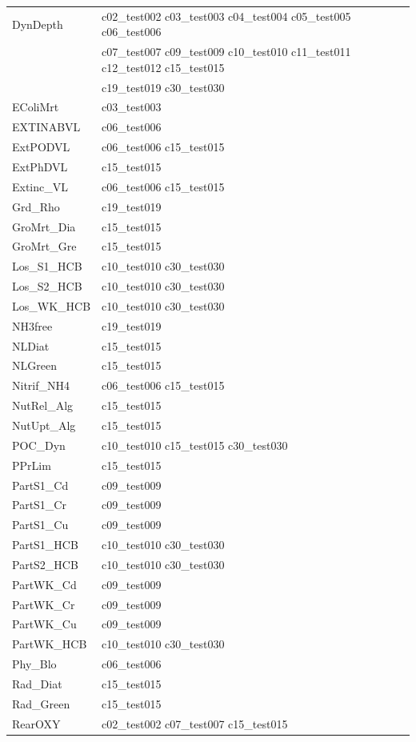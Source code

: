 \begin{longtable}{ll}
DynDepth & c02\_test002 c03\_test003 c04\_test004 c05\_test005 c06\_test006 \\ 
 & c07\_test007 c09\_test009 c10\_test010 c11\_test011 c12\_test012 c15\_test015 \\ 
 & c19\_test019 c30\_test030 \\
EColiMrt & c03\_test003 \\
EXTINABVL & c06\_test006 \\
ExtPODVL & c06\_test006 c15\_test015 \\
ExtPhDVL & c15\_test015 \\
Extinc\_VL & c06\_test006 c15\_test015 \\
Grd\_Rho & c19\_test019 \\
GroMrt\_Dia & c15\_test015 \\
GroMrt\_Gre & c15\_test015 \\
Los\_S1\_HCB & c10\_test010 c30\_test030 \\
Los\_S2\_HCB & c10\_test010 c30\_test030 \\
Los\_WK\_HCB & c10\_test010 c30\_test030 \\
NH3free & c19\_test019 \\
NLDiat & c15\_test015 \\
NLGreen & c15\_test015 \\
Nitrif\_NH4 & c06\_test006 c15\_test015 \\
NutRel\_Alg & c15\_test015 \\
NutUpt\_Alg & c15\_test015 \\
POC\_Dyn & c10\_test010 c15\_test015 c30\_test030 \\
PPrLim & c15\_test015 \\
PartS1\_Cd & c09\_test009 \\
PartS1\_Cr & c09\_test009 \\
PartS1\_Cu & c09\_test009 \\
PartS1\_HCB & c10\_test010 c30\_test030 \\
PartS2\_HCB & c10\_test010 c30\_test030 \\
PartWK\_Cd & c09\_test009 \\
PartWK\_Cr & c09\_test009 \\
PartWK\_Cu & c09\_test009 \\
PartWK\_HCB & c10\_test010 c30\_test030 \\
Phy\_Blo & c06\_test006 \\
Rad\_Diat & c15\_test015 \\
Rad\_Green & c15\_test015 \\
RearOXY & c02\_test002 c07\_test007 c15\_test015 \\

\end{longtable}
